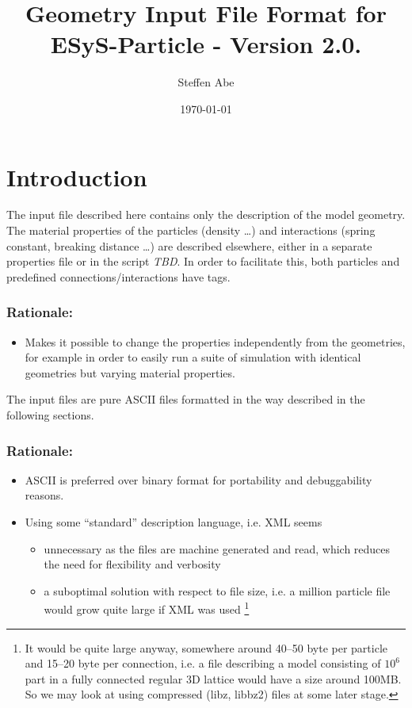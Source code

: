 \documentclass{article}
\begin{document}
\title{Geometry Input File Format for ESyS-Particle - Version 2.0.}
\author{Steffen Abe}
\date{\today}
\maketitle

\section{Introduction}
The input file described here contains only the description of the model geometry. The material properties of the particles (density \dots) and interactions (spring constant, breaking distance \dots) are described elsewhere, either in a separate properties file or in the script \textit{TBD}. In order to facilitate this, both particles and predefined connections/interactions have tags.   
\subsubsection*{Rationale:}
\begin{itemize}
\item Makes it possible to change the properties
independently from the geometries, for example in order to easily run a suite of simulation with identical geometries but varying material properties.
\end{itemize}
The input files are pure ASCII files formatted in the way described in the following sections. 
\subsubsection*{Rationale:}
\begin{itemize}
\item ASCII is preferred over binary format for portability and debuggability reasons.
\item Using some ``standard'' description language, i.e. XML seems 
  \begin{itemize}
  \item unnecessary as the files are machine generated and read, which reduces the need for flexibility and verbosity
  \item a suboptimal solution with respect to file size, i.e. a million particle file would grow quite large if XML was used \footnote{It would be quite large anyway, somewhere around 40--50 byte per particle and 15--20 byte per connection, i.e. a file describing a model consisting of $10^6$ part in a fully connected regular 3D lattice would have a size around 100MB. So we may look at using compressed (libz, libbz2) files at some later stage.} 
  \end{itemize}
\end{itemize}
\end{document}
